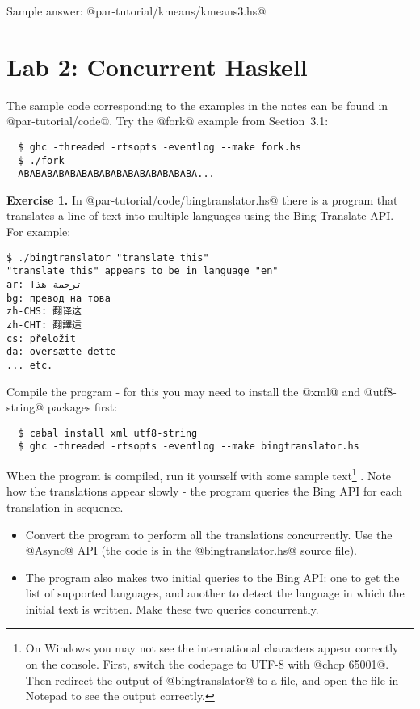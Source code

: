 \documentclass[11pt,a4paper]{article}
\newcommand{\Section}[2]{\section{#2}\label{sec:#1}}
\begin{document}
Sample answer: @par-tutorial/kmeans/kmeans3.hs@

\newpage\Section{conc}{Lab 2: Concurrent Haskell}

The sample code corresponding to the examples in the notes can be
found in @par-tutorial/code@.  Try the @fork@ example from
Section~3.1:

{\small \begin{verbatim}
  $ ghc -threaded -rtsopts -eventlog --make fork.hs
  $ ./fork
  ABABABABABABABABABABABABABABABA...
\end{verbatim}}

\textbf{Exercise 1.} In @par-tutorial/code/bingtranslator.hs@ there is
a program that translates a line of text into multiple languages using
the Bing Translate API.  For example:

{\small \begin{verbatim}
$ ./bingtranslator "translate this"
"translate this" appears to be in language "en"
ar: ترجمة هذا
bg: превод на това
zh-CHS: 翻译这
zh-CHT: 翻譯這
cs: přeložit
da: oversætte dette
... etc.
\end{verbatim}}

\noindent Compile the program - for this you may
need to install the @xml@ and @utf8-string@ packages first:

{\small \begin{verbatim}
  $ cabal install xml utf8-string
  $ ghc -threaded -rtsopts -eventlog --make bingtranslator.hs
\end{verbatim}}

When the program is compiled, run it yourself with some sample
text\footnote{On Windows you may not see the international characters
  appear correctly on the console.  First, switch the codepage to
  UTF-8 with @chcp 65001@.  Then redirect the output of
  @bingtranslator@ to a file, and open the file in Notepad to see the
  output correctly.} . Note how the translations appear slowly - the program queries the Bing API
for each translation in sequence.

\begin{itemize}
\item Convert the program to perform all the translations
  concurrently.  Use the @Async@ API (the code is in the
  @bingtranslator.hs@ source file).
\item The program also makes two initial queries to the Bing API: one
  to get the list of supported languages, and another to detect the
  language in which the initial text is written.  Make these two
  queries concurrently.
\end{itemize}
\end{document}

